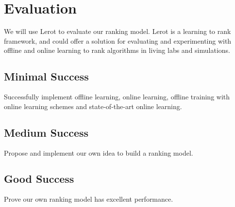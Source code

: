 \documentclass[acmlarge]{acmart}
\begin{document}
\section{Evaluation}
We will use Lerot to evaluate our ranking model. Lerot is a learning to rank framework, and could offer a solution for evaluating and experimenting with offline and online learning to rank algorithms in living labs and simulations.\cite{schuth2013lerot}

\subsection{Minimal Success}
Successfully implement offline learning, online learning, offline training with online learning schemes and state-of-the-art online learning.

\subsection{Medium Success}
Propose and implement our own idea to build a ranking model.

\subsection{Good Success}
Prove our own ranking model has excellent performance.



\end{document}
